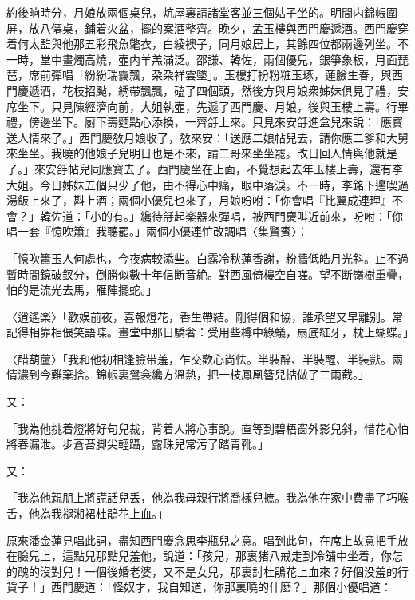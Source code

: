約後晌時分，月娘放兩個桌兒，炕屋裏請諸堂客並三個姑子坐的。明間内錦帳圍屏，放八僊桌，鋪着火盆，擺的案酒整齊。晚夕，孟玉樓與西門慶遞酒。西門慶穿着何太監與他那五彩飛魚氅衣，白綾襖子，同月娘居上，其餘四位都兩邊列坐。不一時，堂中畫燭高燒，壺内羊羔滿泛。邵謙、韓佐，兩個優兒，銀箏象板，月面琵琶，席前彈唱「紛紛瑞靄飄，朶朶祥雲墜」。玉樓打扮粉粧玉琢，蓮臉生春，與西門慶遞酒，花枝招颭，綉帶飄飄，磕了四個頭，然後方與月娘衆姊妹俱見了禮，安席坐下。只見陳經濟向前，大姐執壺，先遞了西門慶、月娘，後與玉樓上壽。行畢禮，傍邊坐下。廚下壽麵點心添換，一齊㧱上來。只見來安㧱進盒兒來說：「應寳送人情來了。」西門慶敎月娘收了，敎來安：「送應二娘帖兒去，請你應二爹和大舅來坐坐。我曉的他娘子兒明日也是不來，請二哥來坐坐罷。改日回人情與他就是了。」來安㧱帖兒同應寳去了。西門慶坐在上面，不覺想起去年玉樓上壽，還有李大姐。今日姊妹五個只少了他，由不得心中痛，眼中落淚。不一時，李銘下邊喫過湯飯上來了，斟上酒；兩個小優兒也來了，月娘吩咐：「你會唱『比翼成連理』不會？」韓佐道：「小的有。」纔待㧱起楽器來彈唱，被西門慶叫近前來，吩咐：「你唱一套『憶吹簫』我聽罷。」兩個小優連忙改調唱〈集賢賓〉：

\begin{myquote}
「憶吹簫玉人何處也，今夜病較添些。白露冷秋蓮香謝，粉牆低皓月光斜。止不過暫時間鏡破釵分，倒勝似數十年信断音絶。對西風倚樓空自嗟。望不断嶺樹重疊，怕的是流光去馬，雁陣擺蛇。」

{\markfont〈逍遙楽〉}「歡娱前夜，喜報燈花，香生帶結。剛得個和協，誰承望又早離别。常記得相靠相偎笑語喋。畫堂中那日驕奢：受用些樽中綠蟻，扇底紅牙，枕上蝴蝶。」

{\markfont〈醋葫蘆〉}「我和他初相逢臉带羞，乍交歡心尚怯。半裝醉、半裝醒、半裝獃。兩情濃到今難棄捨。錦帳裏鴛衾纔方溫熱，把一枝鳳凰簪兒掂做了三兩截。」
\end{myquote}

又：

\begin{myquote}
「我為他挑着燈將好句兒裁，背着人將心事說。直等到碧梧窗外影兒斜，惜花心怕將春漏泄。步蒼苔脚尖輕躡，露珠兒常污了踏青靴。」
\end{myquote}

又：

\begin{myquote}
「我為他親朋上將謊話兒丢，他為我母親行將喬樣兒摭。我為他在家中費盡了巧喉舌，他為我褪湘裙杜鵑花上血。」
\end{myquote}

原來潘金蓮見唱此詞，盡知西門慶念思李瓶兒之意。唱到此句，在席上故意把手放在臉兒上，這點兒那點兒羞他，說道：「孩兒，那裏猪八戒走到冷舖中坐着，你怎的醜的沒對兒！一個後婚老婆，又不是女兒，那裏討杜鵑花上血來？好個没羞的行貨子！」西門慶道：「怪奴才，我自知道，你那裏曉的什麽？」那個小優唱道：

